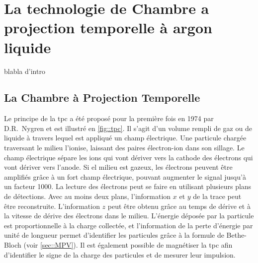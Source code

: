 
\chapter{La technologie de Chambre a projection temporelle à argon liquide}

  blabla d'intro
    
  \section{La Chambre à Projection Temporelle}
    Le principe de la \acrfull{tpc} a été proposé pour la première fois en 1974 par D.R.~Nygren\cite{Nygren1974} et est illustré en \autoref{fig::tpc}. Il s'agit d'un volume rempli de gaz ou de liquide à travers lequel est appliqué un champ électrique. Une particule chargée traversant le milieu l'ionise, laissant des paires électron-ion dans son sillage. Le champ électrique sépare les ions qui vont dériver vers la cathode des électrons qui vont dériver vers l'anode. Si el milieu est gazeux, les électrons peuvent être amplifiés grâce à un fort champ électrique, pouvant augmenter le signal jusqu'à un facteur 1000. La lecture des électrons peut se faire en utilisant plusieurs plans de détections. Avec au moins deux plans, l'information $x$ et $y$ de la trace peut être reconstruite. L'information $z$ peut être obtenu grâce au temps de dérive et à la vitesse de dérive des électrons dans le milieu. L'énergie déposée par la particule est proportionnelle à la charge collectée, et l'information de la perte d'énergie par unité de longueur permet d'identifier les particules grâce à la formule de Bethe-Bloch (voir \autoref{sec::MPV}). Il est également possible de magnétiser la \gls{tpc} afin d'identifier le signe de la charge des particules et de mesurer leur impulsion.

